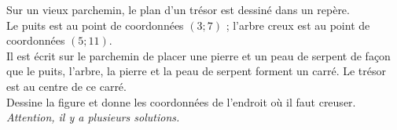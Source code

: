 Sur un vieux parchemin, le plan d'un trésor est dessiné dans un repère.\\Le puits est au point de coordonnées $(3;7)$ ; l'arbre creux est au point de coordonnées $(5;11)$.
\\Il est écrit sur le parchemin de placer une pierre et un peau de serpent de façon que le puits, l'arbre, la pierre et la peau de serpent forment un carré. Le trésor est au centre de ce carré.
\\Dessine la figure et donne les coordonnées de l'endroit où il faut creuser.
\\{\em Attention, il y a plusieurs solutions.}